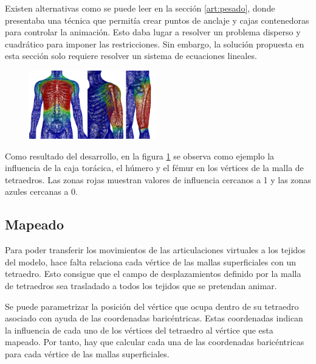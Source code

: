 Existen alternativas como se puede leer en la sección \ref{art:pesado}, donde \cite{Jacobson:2011} presentaba una técnica que permitía crear puntos de anclaje y cajas contenedoras para controlar la animación. Esto daba lugar a resolver un problema disperso y cuadrático para imponer las restricciones. Sin embargo, la solución propuesta en esta sección solo requiere resolver un sistema de ecuaciones lineales. %


 \begin{figure}[h]
   \centering
\includegraphics[width=0.49\textwidth]{IMG/weights.png}
     \caption{}
      \label{fig:pesado}
\end{figure}
 
Como resultado del desarrollo, en la figura \ref{fig:pesado} se observa como ejemplo la influencia de la caja torácica, el húmero y el fémur en los vértices de la malla de tetraedros. Las zonas rojas muestran valores de influencia cercanos a 1 y las zonas azules cercanas a 0. 






\subsection{Mapeado}
\label{posing:Mapeado}
%
Para poder transferir los movimientos de las articulaciones virtuales a los tejidos del modelo, hace falta relaciona cada vértice de las mallas superficiales con un tetraedro. Esto consigue que el campo de desplazamientos definido por la malla de tetraedros sea trasladado a todos los tejidos que se pretendan animar.

Se puede parametrizar la posición del vértice que ocupa dentro de su tetraedro asociado con ayuda de las coordenadas baricéntricas. Estas coordenadas indican la influencia de cada uno de los vértices del tetraedro al vértice que esta mapeado. Por tanto, hay que calcular cada una de las coordenadas baricéntricas para cada vértice de las mallas superficiales.

